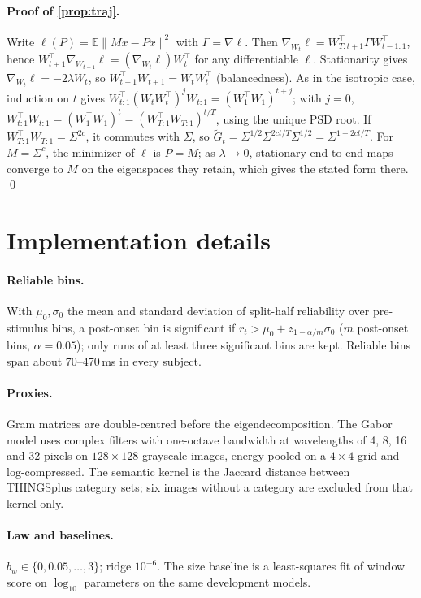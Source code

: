 \documentclass[10pt]{article}
\theoremstyle{plain}
\theoremstyle{definition}
\theoremstyle{remark}
\newcommand{\E}{\mathbb{E}}
\newcommand{\T}{\top}
\begin{document}
\paragraph{Proof of \cref{prop:traj}.} Write $\ell(P) = \E\lVert Mx-Px\rVert^2$ with
$\Gamma = \nabla\ell$. Then $\nabla_{W_t}\ell = W_{T:t+1}^\T\Gamma W_{t-1:1}^\T$, hence
$W_{t+1}^\T\nabla_{W_{t+1}}\ell = (\nabla_{W_t}\ell)W_t^\T$ for any differentiable $\ell$.
Stationarity gives $\nabla_{W_t}\ell = -2\lambda W_t$, so $W_{t+1}^\T W_{t+1} = W_tW_t^\T$
(balancedness). As in the isotropic case, induction on $t$ gives
$W_{t:1}^\T(W_tW_t^\T)^jW_{t:1} = (W_1^\T W_1)^{t+j}$; with $j=0$, $W_{t:1}^\T W_{t:1} =
(W_1^\T W_1)^t = (W_{T:1}^\T W_{T:1})^{t/T}$, using the unique PSD root. If
$W_{T:1}^\T W_{T:1} = \Sigma^{2c}$, it commutes with $\Sigma$, so
$\tilde G_t = \Sigma^{1/2}\Sigma^{2ct/T}\Sigma^{1/2} = \Sigma^{1+2ct/T}$. For $M=\Sigma^c$, the
minimizer of $\ell$ is $P=M$; as $\lambda\to0$, stationary end-to-end maps converge to $M$ on the
eigenspaces they retain, which gives the stated form there. \qed

\section{Implementation details}
\label{app:impl}

\paragraph{Reliable bins.} With $\mu_0,\sigma_0$ the mean and standard deviation of split-half
reliability over pre-stimulus bins, a post-onset bin is significant if
$r_t > \mu_0 + z_{1-\alpha/m}\sigma_0$ ($m$ post-onset bins, $\alpha=0.05$); only runs of at
least three significant bins are kept. Reliable bins span about 70--470\,ms in every subject.

\paragraph{Proxies.} Gram matrices are double-centred before the eigendecomposition. The Gabor
model uses complex filters with one-octave bandwidth at wavelengths of 4, 8, 16 and 32 pixels on
$128\times128$ grayscale images, energy pooled on a $4\times4$ grid and log-compressed. The
semantic kernel is the Jaccard distance between THINGSplus category sets; six images without a
category are excluded from that kernel only.

\paragraph{Law and baselines.} $b_w\in\{0, 0.05, \dots, 3\}$; ridge $10^{-6}$. The size baseline
is a least-squares fit of window score on $\log_{10}$ parameters on the same development models.
\end{document}
